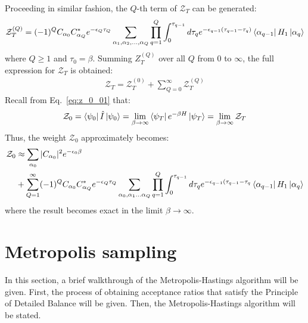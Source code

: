 \documentclass[12pt, two sided]{article}
\begin{document}
Proceeding in similar fashion, the $Q$-th term of $\mathcal{Z}_T$ can be generated:
\begin{equation}
\label{eq:Z^q}
\mathcal{Z}_T^{(Q)} = (-1)^{Q}  C_{\alpha_0} C_{\alpha_Q}^* e^{-\epsilon_{Q} \tau_Q} \sum_{\alpha_1,\alpha_2,\dots,\alpha_Q} \prod_{q=1}^Q \int_0^{\tau_{q-1}} d\tau_q e^{-\epsilon_{q-1}(\tau_{q-1}-\tau_q)} 
\bra{\alpha_{q-1}} H_1 \ket{\alpha_q}
\end{equation}
where $Q \geq 1$ and $\tau_0 = \beta$. Summing $Z_T^{(Q)}$ over all $Q$ from $0$ to $\infty$, the full expression for $\mathcal{Z}_T$ is obtained:
%
\begin{equation}
\begin{aligned}
\mathcal{Z}_T = \mathcal{Z}_T^{(0)} + \sum_{Q=0}^{\infty} \mathcal{Z}_T^{(Q)}
\end{aligned}
\end{equation}
%
Recall from Eq.~\eqref{eq:z_0_01} that:
%
\begin{equation}
\mathcal{Z}_0 = \bra{\psi_0} \hat{I} \ket{\psi_0} = \lim_{\beta\to\infty} \bra{\psi_T} e^{-\beta H} \ket{\psi_T} = \lim_{\beta\to\infty} \mathcal{Z}_T
\end{equation}
%
Thus, the weight $\mathcal{Z}_0$ approximately becomes:
\begin{equation}
\begin{aligned}
\label{eq:Z_0}
\mathcal{Z}_0 &\approx \sum_{\alpha_0} \vert C_{\alpha_0} \vert^2 e^{-\epsilon_{0} \beta} \\ &+ 
\sum_{Q=1}^{\infty} (-1)^Q C_{\alpha_0} C_{\alpha_Q}^* e^{-\epsilon_{Q} \tau_Q} \sum_{\alpha_0, \alpha_1 \dots \alpha_Q} \prod_{q=1}^Q \int_0^{\tau_{q-1}} d\tau_q e^{-\epsilon_{q-1}(\tau_{q-1}-\tau_q} 
\bra{\alpha_{q-1}} H_1 \ket{\alpha_q}
\end{aligned}
\end{equation}
where the result becomes exact in the limit $\beta\to\infty$.

\section{Metropolis sampling}

In this section, a brief walkthrough of the Metropolis-Hastings algorithm \cite{doi:10.1063/1.1699114} will be given. First, the process of obtaining acceptance ratios that satisfy the Principle of Detailed Balance will be given. Then, the Metropolis-Hastings algorithm will be stated.
\end{document}
